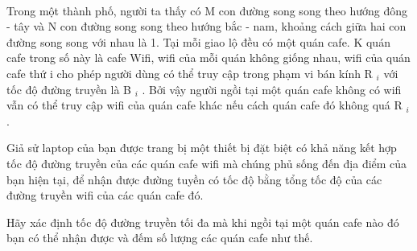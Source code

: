  

Trong một thành phố, người ta thấy có M con đường song song theo hướng đông - tây và N con đường song song theo hướng bắc - nam, khoảng cách giữa hai con đường song song với nhau là 1. Tại mỗi giao lộ đều có một quán cafe. K quán cafe trong số này là cafe Wifi, wifi của mỗi quán không giống nhau, wifi của quán cafe thứ i cho phép người dùng có thể truy cập trong phạm vi bán kính R $_ i $ với tốc độ đường truyền là B $_ i $ . Bởi vậy người ngồi tại một quán cafe không có wifi vẫn có thể truy cập wifi của quán cafe khác nếu cách quán cafe đó không quá R $_ i $ .

Giả sử laptop của bạn được trang bị một thiết bị đặt biệt có khả năng kết hợp tốc độ đường truyền của các quán cafe wifi mà chúng phủ sống đến địa điểm của bạn hiện tại, để nhận được đường tuyền có tốc độ bằng tổng tốc độ của các đường truyền wifi của các quán cafe đó.

Hãy xác định tốc độ đường truyền tối đa mà khi ngồi tại một quán cafe nào đó bạn có thể nhận được và đếm số lượng các quán cafe như thế.

\